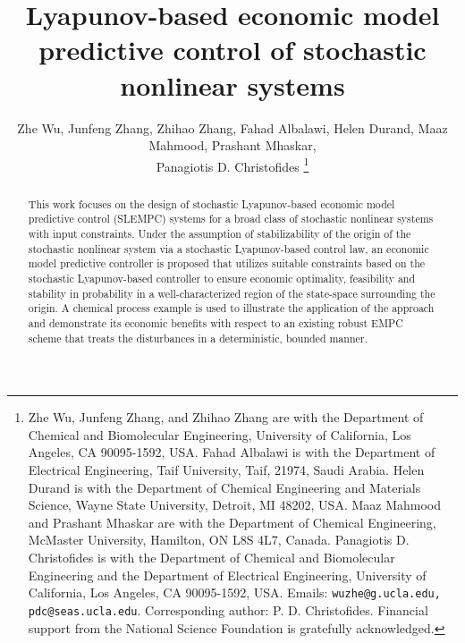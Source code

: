 \documentclass[letterpaper, 10pt, conference]{ieeeconf}
\title{\textbf{Lyapunov-based economic model predictive control of stochastic nonlinear systems}}
\author{\small{Zhe Wu}, Junfeng Zhang, Zhihao Zhang, Fahad Albalawi, Helen Durand, Maaz Mahmood, Prashant Mhaskar,\\ Panagiotis D. Christofides
	\thanks{Zhe Wu, Junfeng Zhang, and Zhihao Zhang are with the Department of Chemical and Biomolecular Engineering, University of California, Los Angeles, CA 90095-1592, USA. Fahad Albalawi is with the Department of Electrical Engineering, Taif University, Taif, 21974, Saudi Arabia. Helen Durand is with the Department of Chemical Engineering and Materials Science, Wayne State University, Detroit, MI 48202, USA. Maaz Mahmood and Prashant Mhaskar are with the Department of Chemical Engineering, McMaster University, Hamilton, ON L8S 4L7, Canada. Panagiotis D. Christofides is with the Department of Chemical and Biomolecular Engineering and the Department of Electrical Engineering, University of California, Los Angeles, CA 90095-1592, USA. Emails: {\tt\small wuzhe@g.ucla.edu, pdc@seas.ucla.edu}. Corresponding author: P. D. Christofides. Financial support from the National Science Foundation is gratefully acknowledged.}}
\begin{document}
	
	\maketitle
	
	\begin{abstract}
	This work focuses on the design of stochastic Lyapunov-based economic model predictive control (SLEMPC) systems for a broad class of stochastic
	nonlinear systems with input constraints. Under the assumption of stabilizability of the origin of the stochastic nonlinear system via a stochastic Lyapunov-based control law, an
	economic model predictive controller is proposed that utilizes suitable constraints based on the stochastic Lyapunov-based controller to ensure economic optimality, feasibility and stability in probability in a well-characterized region of the state-space surrounding the origin. A chemical process example is used to illustrate the application of the approach and demonstrate
	its economic benefits with respect to an existing robust EMPC scheme that treats the disturbances in a deterministic, bounded manner.
	\end{abstract}
	
	
\end{document}
